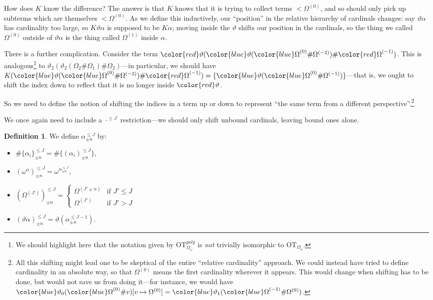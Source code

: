 \documentclass[11pt]{amsart}
\theoremstyle{definition}
\newtheorem{definition}[theorem]{Definition}
\begin{document}
How does $K$ know the difference? The answer is that $K$ knows that it is trying to collect terms $<\Omega^{(0)}$, and so should only pick up subterms which are themselves $<\Omega^{(0)}$. As we define this inductively, our ``position'' in the relative hierarchy of cardinals changes: say $\vartheta\alpha$ has cardinality too large, so $K\vartheta\alpha$ is supposed to be $K\alpha$; moving inside the $\vartheta$ shifts our position in the cardinals, so the thing we called $\Omega^{(0)}$ outside of $\vartheta\alpha$ is the thing called $\Omega^{(1)}$ inside $\alpha$.

There is a further complication. Consider the term ${\color{red}\vartheta}({\color{blue}\vartheta}({\color{blue}\Omega}^{(0)}\#\Omega^{(-2)})\#{\color{red}\Omega}^{(-1)})$. This is analogous\footnote{We should highlight here that the notation given by $\mathrm{OT}^{poly}_{\Omega_\omega}$ is \emph{not} trivially isomorphic to $\mathrm{OT}_{\Omega_\omega}$.} to $\vartheta_2(\vartheta_2(\Omega_2\#\Omega_1)\#\Omega_2)$---in particular, we should have $K({\color{blue}\vartheta}({\color{blue}\Omega}^{(0)}\#\Omega^{(-2)})\#{\color{red}\Omega}^{(-1)})=\{{\color{blue}\vartheta}({\color{blue}\Omega}^{(0)}\#\Omega^{(-1)})\}$---that is, we ought to shift the index down to reflect that it is no longer inside ${\color{red}\vartheta}$.

So we need to define the notion of shifting the indices in a term up or down to represent ``the same term from a different perspective''.\footnote{All this shifting might lead one to be skeptical of the entire ``relative cardinality'' approach. We could instead have tried to define cardinality in an absolute way, so that $\Omega^{(0)}$ means the first cardinality wherever it appears. This would change when shifting has to be done, but would not save us from doing it---for instance, we would have ${\color{blue}\vartheta_0}({\color{blue}\Omega}^{(0)}\#v)[v\mapsto\Omega^{(0)}]={\color{blue}\vartheta_1}({\color{blue}\Omega}^{(-1)}\#\Omega^{(0)})$.}

We once again need to include a $\cdot^{\leq J}$ restriction---we should only shift unbound cardinals, leaving bound ones alone.
\begin{definition}
  We define $\alpha^{\leq J}_{\pm n}$ by:
  \begin{itemize}
  \item $\#\{\alpha_i\}^{\leq J}_{\pm n}=\#\{(\alpha_i)^{\leq J}_{\pm n}\}$,
  \item $(\omega^\alpha)^{\leq J}_{\pm n}=\omega^{\alpha^{\leq J}_{\pm n}}$,
  \item $(\Omega^{(J')})^{\leq J}_{\pm n}=\left\{\begin{array}{ll}
                                                   \Omega^{(J'\pm n)}&\text{if }J'\leq J\\
                                                   \Omega^{(J')}&\text{if }J'>J
                                                 \end{array}\right.$
  \item $(\vartheta\alpha)^{\leq J}_{\pm n}=\vartheta(\alpha^{\leq J-1}_{\pm n})$.                 \end{itemize}
\end{definition}
\end{document}
